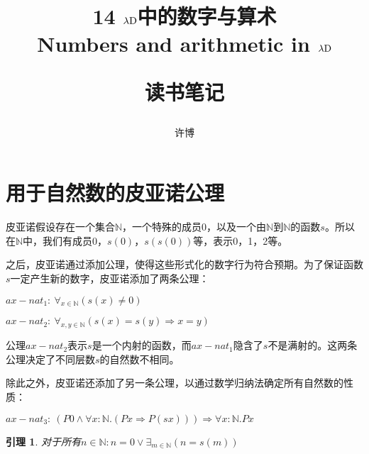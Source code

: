 \documentclass[UTF8]{article}
\title{14 $\lambda{\rm D}$中的数字与算术\\Numbers and arithmetic in $\lambda{\rm D}$\\[2ex]\begin{large}读书笔记\end{large}}
\author{许博}
\date{}
\newtheorem{lemma}[thm]{引理}
\begin{document}
\maketitle
	\section{用于自然数的皮亚诺公理}
	\noindent
	皮亚诺假设存在一个集合$\mathbb{N}$，一个特殊的成员0，以及一个由$\mathbb{N}$到$\mathbb{N}$的函数$s$。所以在$\mathbb{N}$中，我们有成员0，$s(0)$，$s(s(0))$等，表示0，1，2等。
	
		之后，皮亚诺通过添加公理，使得这些形式化的数字行为符合预期。为了保证函数$s$一定产生新的数字，皮亚诺添加了两条公理：
		
		$ax{-}nat_1:\ \forall_{x\in\mathbb{N}}(s(x)\not=0)$
		
		$ax{-}nat_2:\ \forall_{x,y\in\mathbb{N}}(s(x)=s(y)\Rightarrow x=y)$
		
		公理$ax{-}nat_2$表示$s$是一个内射的函数，而$ax{-}nat_1$隐含了$s$不是满射的。这两条公理决定了不同层数$s$的自然数不相同。
		
		除此之外，皮亚诺还添加了另一条公理，以通过数学归纳法确定所有自然数的性质：
		
		$ax{-}nat_3:\ (P0\land\forall x:\mathbb{N}.(Px\Rightarrow P(sx)))\Rightarrow\forall x:\mathbb{N}.Px$
		
		\begin{lemma} 对于所有$n\in\mathbb{N}:n=0\lor\exists_{m\in\mathbb{N}}(n=s(m))$
		\end{lemma}
\end{document}
